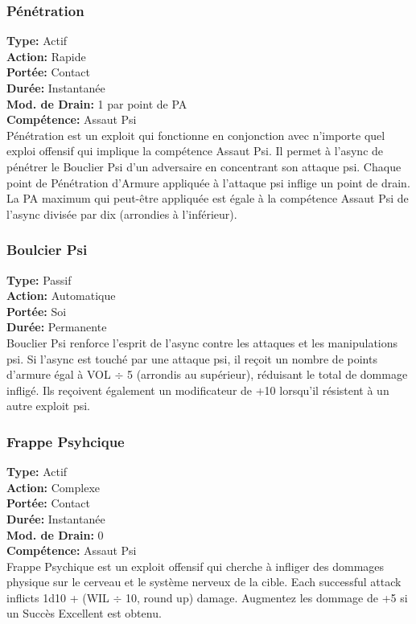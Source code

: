 \subsubsection{Pénétration} \textbf{Type:} Actif \\ \textbf{Action:} Rapide \\ \textbf{Portée:} Contact \\ \textbf{Durée:} Instantanée \\ \textbf{Mod. de Drain:} 1 par point de PA \\ \textbf{Compétence:} Assaut Psi \\ Pénétration est un exploit qui fonctionne en conjonction avec n'importe quel exploi offensif qui implique la compétence Assaut Psi. Il permet à l'async de pénétrer le Bouclier Psi d'un adversaire en concentrant son attaque psi. Chaque point de Pénétration d'Armure appliquée à l'attaque psi inflige un point de drain. La PA maximum qui peut-être appliquée est égale à la compétence Assaut Psi de l'async divisée par dix (arrondies à l'inférieur). 

\subsubsection{Boulcier Psi} \textbf{Type:} Passif \\ \textbf{Action:} Automatique \\ \textbf{Portée:} Soi \\ \textbf{Durée:} Permanente \\ Bouclier Psi renforce l'esprit de l'async contre les attaques et les manipulations psi. Si l'async est touché par une attaque psi, il reçoit un nombre de points d'armure égal à VOL  $\div$ 5 (arrondis au supérieur), réduisant le total de dommage infligé. Ils reçoivent également un modificateur de +10 lorsqu'il résistent à un autre exploit psi. 

\subsubsection{Frappe Psyhcique} \textbf{Type:} Actif \\ \textbf{Action:} Complexe \\ \textbf{Portée:} Contact \\ \textbf{Durée:} Instantanée \\ \textbf{Mod. de Drain:} 0 \\ \textbf{Compétence:} Assaut Psi \\ Frappe Psychique est un exploit offensif qui cherche à infliger des dommages physique sur le cerveau et le système nerveux de la cible. Each successful attack inflicts 1d10 + (WIL $\div$ 10, round up) damage. Augmentez les dommage de +5 si un Succès Excellent est obtenu. 

